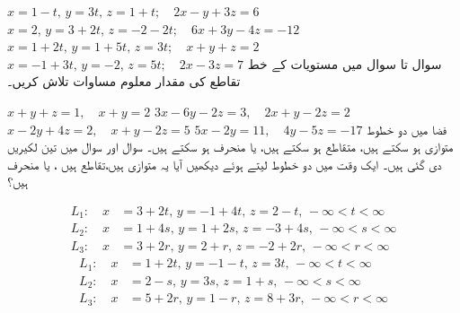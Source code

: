 $x=1-t,\,y=3t,\,z=1+t;\quad 2x-y+3z=6$
$x=2,\,y=3+2t,\,z=-2-2t;\quad 6x+3y-4z=-12$
$x=1+2t,\, y=1+5t,\,z=3t;\quad x+y+z=2$
$x=-1+3t,\,y=-2,\,z=5t;\quad 2x-3z=7$
سوال  تا سوال  میں مستویات  کے خط تقاطع کی مقدار معلوم مساوات تلاش کریں۔

$x+y+z=1,\quad x+y=2$
$3x-6y-2z=3,\quad 2x+y-2z=2$
$x-2y+4z=2,\quad x+y-2z=5$
$5x-2y=11,\quad 4y-5z=-17$
فضا میں  دو       خطوط متوازی  ہو سکتے ہیں، متقاطع ہو سکتے ہیں، یا منحرف  ہو سکتے ہیں۔ سوال  اور سوال  میں تین لکیریں  دی گئی ہیں۔  ایک وقت میں دو خطوط  لیتے ہوئے دیکھیں آیا یہ متوازی ہیں،تقاطع  ہیں ، یا منحرف ہیں؟

\begin{align*}
L_1:\quad x&=3+2t,\,y=-1+4t,\,z=2-t,\,-\infty<t<\infty\\
L_2:\quad x&=1+4s,\,y=1+2s,\,z=-3+4s,\,-\infty<s<\infty\\
L_3:\quad x&=3+2r,\, y=2+r,\,z=-2+2r,\,-\infty<r<\infty
\end{align*}
\begin{align*}
L_1:\quad x&=1+2t,\,y=-1-t,\,z=3t,\,-\infty<t<\infty\\
L_2:\quad x&=2-s,\,y=3s,\,z=1+s,\,-\infty<s<\infty\\
L_3:\quad x&=5+2r,\,y=1-r,\,z=8+3r,\,-\infty<r<\infty
\end{align*}

